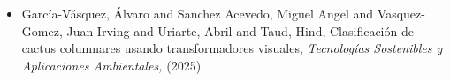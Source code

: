 \begin{itemize} 
\item Garc{\'i}a-V{\'a}squez, {\'A}lvaro and Sanchez Acevedo, Miguel Angel and Vasquez-Gomez, Juan Irving and Uriarte, Abril and Taud, Hind, Clasificaci{\'o}n de cactus columnares usando transformadores visuales,\textit{ Tecnolog{\'i}as Sostenibles y Aplicaciones Ambientales,} (2025)
\end{itemize} 
